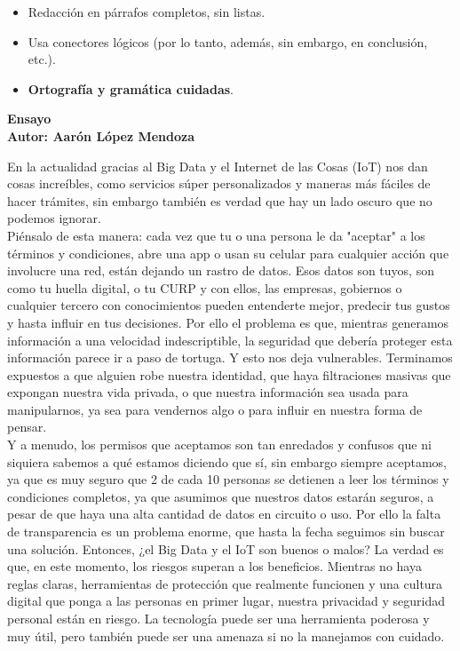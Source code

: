 \documentclass[12pt]{report}
\begin{document}
\begin{enumerate}[label=\textbf{\arabic*.}, leftmargin=*]
\begin{enumerate}[label=\textbf{\alph*.}, leftmargin=*, itemsep=1.0em]
\begin{itemize}
\begin{itemize}
\begin{itemize}
      \item Redacci\'on en p\'arrafos completos, sin listas.
      \item Usa conectores l\'ogicos (por lo tanto, adem\'as, sin embargo, en conclusi\'on, etc.).
      \item \textbf{Ortograf\'ia y gram\'atica cuidadas}.
    \end{itemize}
  \end{itemize}
\end{itemize}
\newpage
\textbf{Ensayo\\
        Autor: Aar\'on L\'opez Mendoza}   


En la actualidad gracias al Big Data y el Internet de las Cosas (IoT) nos dan cosas increíbles, como servicios súper personalizados y maneras más fáciles de hacer trámites, sin embargo también es verdad que hay un lado oscuro que no podemos ignorar.\\
Piénsalo de esta manera: cada vez que tu o una persona le da "aceptar" a los términos y condiciones, abre una app o usan su celular para cualquier acción que involucre una red, están dejando un rastro de datos. Esos datos son tuyos, son como tu huella digital, o tu CURP y con ellos, las empresas, gobiernos o cualquier tercero con conocimientos pueden entenderte mejor, predecir tus gustos y hasta influir en tus decisiones.
Por ello el problema es que, mientras generamos información a una velocidad indescriptible, la seguridad que debería proteger esta información parece ir a paso de tortuga. Y esto nos deja vulnerables. Terminamos expuestos a que alguien robe nuestra identidad, que haya filtraciones masivas que expongan nuestra vida privada, o que nuestra información sea usada para manipularnos, ya sea para vendernos algo o para influir en nuestra forma de pensar.\\

Y a menudo, los permisos que aceptamos son tan enredados y confusos que ni siquiera sabemos a qué estamos diciendo que sí, sin embargo siempre aceptamos, ya que es muy seguro que 2 de cada 10 personas se detienen a leer los términos y condiciones completos, ya que asumimos que nuestros datos estarán seguros, a pesar de que haya una alta cantidad de datos en circuito o uso. Por ello la falta de transparencia es un problema enorme, que hasta la fecha seguimos sin buscar una solución.
Entonces, ¿el Big Data y el IoT son buenos o malos? La verdad es que, en este momento, los riesgos superan a los beneficios. Mientras no haya reglas claras, herramientas de protección que realmente funcionen y una cultura digital que ponga a las personas en primer lugar, nuestra privacidad y seguridad personal están en riesgo. La tecnología puede ser una herramienta poderosa y muy útil, pero también puede ser una amenaza si no la manejamos con cuidado.\\


\end{enumerate}
\end{enumerate}
\end{document}
